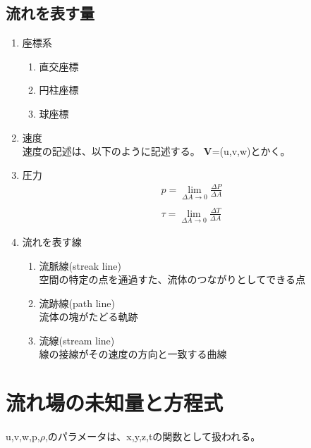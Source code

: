 \documentclass[a4j,twoside,openright,11pt]{jarticle}
\begin{document}
\subsection{流れを表す量}
\begin{enumerate}
\item 座標系\\
\begin{enumerate}
\item 直交座標
\item 円柱座標
\item 球座標
\end{enumerate}
\item 速度\\
速度の記述は、以下のように記述する。
{\bf V}=(u,v,w)とかく。
\item 圧力\\
\begin{eqnarray}
p=\lim_{\Delta A \rightarrow0}\frac{\Delta P}{\Delta A}\\
\nonumber\\
\tau=\lim_{\Delta A \rightarrow 0}\frac{\Delta T}{\Delta A}
\end{eqnarray}
\item 流れを表す線\\
\begin{enumerate}
\item 流脈線(streak line)\\
空間の特定の点を通過すた、流体のつながりとしてできる点
\item 流跡線(path line)\\
流体の塊がたどる軌跡
\item 流線(stream line)\\
線の接線がその速度の方向と一致する曲線
\end{enumerate}

\end{enumerate}

\section{流れ場の未知量と方程式}
u,v,w,p,$\rho$,のパラメータは、x,y,z,tの関数として扱われる。
\end{document}
